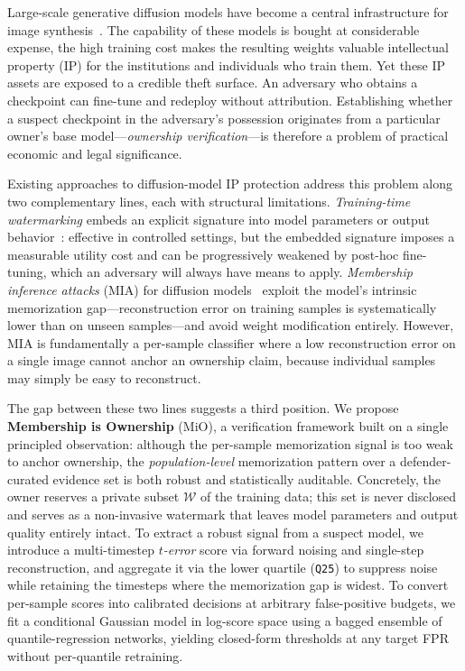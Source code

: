 \documentclass{article}
\begin{document}
Large-scale generative diffusion models have become a central infrastructure for image synthesis~\citep{rombach2022high}. The capability of these models is bought at considerable expense, the high training cost makes the resulting weights valuable intellectual property (IP) for the institutions and individuals who train them. Yet these IP assets are exposed to a credible theft surface. An adversary who obtains a checkpoint can fine-tune and redeploy without attribution. Establishing whether a suspect checkpoint in the adversary's possession originates from a particular owner's base model—\emph{ownership verification}—is therefore a problem of practical economic and legal significance.

Existing approaches to diffusion-model IP protection address this problem along two complementary lines, each with structural limitations. \emph{Training-time watermarking} embeds an explicit signature into model parameters or output behavior~\citep{peng2023watermark,zhao2023recipe,wang2025sleepermark}: effective in controlled settings, but the embedded signature imposes a measurable utility cost and can be progressively weakened by post-hoc fine-tuning, which an adversary will always have means to apply. \emph{Membership inference attacks} (MIA) for diffusion models~\citep{kong2024efficient,matsumoto2023membership,hu2023loss} exploit the model's intrinsic memorization gap—reconstruction error on training samples is systematically lower than on unseen samples—and avoid weight modification entirely. However, MIA is fundamentally a per-sample classifier where a low reconstruction error on a single image cannot anchor an ownership claim, because individual samples may simply be easy to reconstruct.

The gap between these two lines suggests a third position. We propose \textbf{Membership is Ownership} (MiO), a verification framework built on a single principled observation: although the per-sample memorization signal is too weak to anchor ownership, the \emph{population-level} memorization pattern over a defender-curated evidence set is both robust and statistically auditable. Concretely, the owner reserves a private subset $\mathcal{W}$ of the training data; this set is never disclosed and serves as a non-invasive watermark that leaves model parameters and output quality entirely intact. To extract a robust signal from a suspect model, we introduce a multi-timestep \emph{$t$-error} score via forward noising and single-step reconstruction, and aggregate it via the lower quartile (\texttt{Q25}) to suppress noise while retaining the timesteps where the memorization gap is widest. To convert per-sample scores into calibrated decisions at arbitrary false-positive budgets, we fit a conditional Gaussian model in log-score space using a bagged ensemble of quantile-regression networks, yielding closed-form thresholds at any target FPR without per-quantile retraining.
\end{document}
